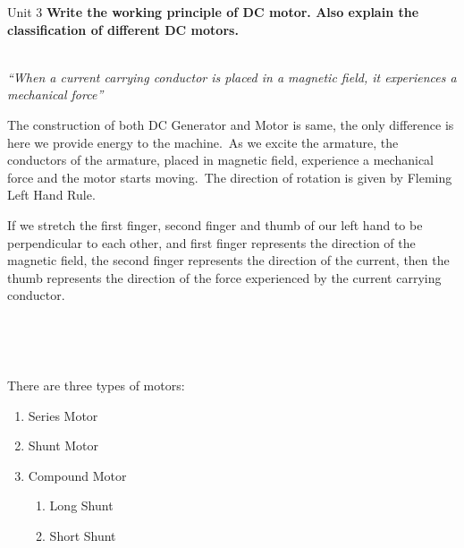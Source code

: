 \documentclass[11pt]{beamer}
\begin{document}
    \begin{frame}[t,allowframebreaks]{Unit 3}
        \textbf{\Large Write the working principle of DC motor. Also explain the classification of different DC
        motors.}\\[20pt]

        \begin{center}
            \underline{}\\[10pt]%
            \textit{``When a current carrying conductor is placed in a magnetic field, it experiences a mechanical
            force''}
        \end{center}

        The construction of both DC Generator and Motor is same, the only difference is here we provide energy to the
        machine.\ As we excite the armature, the conductors of the armature, placed in magnetic field, experience a
        mechanical force and the motor starts moving.\ The direction of rotation is given by Fleming Left Hand Rule.

        \framebreak

        If we stretch the first finger, second finger and thumb of our left hand to be perpendicular to each other,
        and first finger represents the direction of the magnetic field, the second finger represents the direction
        of the current, then the thumb represents the direction of the force experienced by the current carrying
        conductor.

        \\[10pt]

        \begin{center}
            \underline{}\\[10pt]%
        \end{center}

        There are three types of motors:

        \begin{enumerate}
            \item Series Motor
            \item Shunt Motor
            \item Compound Motor
            \begin{enumerate}
                \item Long Shunt
                \item Short Shunt
            \end{enumerate}
        \end{enumerate}
    \end{frame}
\end{document}

